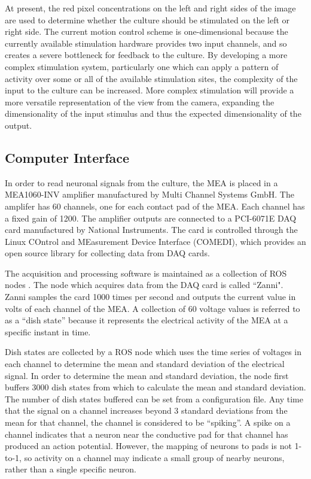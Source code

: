 \documentclass[letterpaper]{article}
\begin{document}
At present, the red pixel concentrations on the left and right sides of the image are used to determine whether the culture should be stimulated on the left or right side. 
The current motion control scheme is one-dimensional because the currently available stimulation hardware provides two input channels, and so creates a severe bottleneck for feedback to the culture. 
By developing a more complex stimulation system, particularly one which can apply a pattern of activity over some or all of the available stimulation sites, the complexity of the input to the culture can be increased. 
More complex stimulation will provide a more versatile representation of the view from the camera, expanding the dimensionality of the input stimulus and thus the expected dimensionality of the output.

\subsection{Computer Interface}

In order to read neuronal signals from the culture, the MEA is placed in a MEA1060-INV amplifier manufactured by Multi Channel Systems GmbH. 
The amplifer has 60 channels, one for each contact pad of the MEA.
Each channel has a fixed gain of 1200.
The amplifier outputs are connected to a PCI-6071E DAQ card manufactured by National Instruments. 
The card is controlled through the Linux COntrol and MEasurement Device Interface (COMEDI), which provides an open source library for collecting data from DAQ cards. 

The acquisition and processing software is maintained as a collection of ROS nodes \cite{ROSAnnouncementPaper}.
The node which acquires data from the DAQ card is called ``Zanni". 
Zanni samples the card 1000 times per second and outputs the current value in volts of each channel of the MEA. 
A collection of 60 voltage values is referred to as a ``dish state'' because it represents the electrical activity of the MEA at a specific instant in time. 

Dish states are collected by a ROS node which uses the time series of voltages in each channel to determine the mean and standard deviation of the electrical signal. 
In order to determine the mean and standard deviation, the node first buffers 3000 dish states from which to calculate the mean and standard deviation. 
The number of dish states buffered can be set from a configuration file. 
Any time that the signal on a channel increases beyond 3 standard deviations from the mean for that channel, the channel is considered to be ``spiking''. 
A spike on a channel indicates that a neuron near the conductive pad for that channel has produced an action potential. 
However, the mapping of neurons to pads is not 1-to-1, so activity on a channel may indicate a small group of nearby neurons, rather than a single specific neuron.
\end{document}
